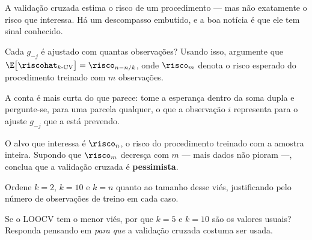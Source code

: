 A validação cruzada estima o risco de um procedimento --- mas não exatamente o
risco que interessa. Há um descompasso embutido, e a boa notícia é que ele tem
sinal conhecido.
\begin{itens}
  \item {} Cada $g_{-j}$ é ajustado com quantas observações? Usando isso,
        argumente que
        $\E\big[\riscohat_{k\text{-CV}}\big]=\risco_{n-n/k}$, onde $\risco_m$
        denota o risco esperado do procedimento treinado com $m$ observações.

        A conta é mais curta do que parece: tome a esperança dentro da soma dupla
        e pergunte-se, para uma parcela qualquer, o que a observação $i$ representa
        para o ajuste $g_{-j}$ que a está prevendo.
  \item {} O alvo que interessa é $\risco_n$, o risco do procedimento
        treinado com a amostra inteira. Supondo que $\risco_m$ decresça com $m$ ---
        mais dados não pioram ---, conclua que a validação cruzada é
        \textbf{pessimista}.
  \item {} Ordene $k=2$, $k=10$ e $k=n$ quanto ao tamanho desse viés,
        justificando pelo número de observações de treino em cada caso.
  \item {} Se o LOOCV tem o menor viés, por que $k=5$ e $k=10$ são os
        valores usuais? Responda pensando em \emph{para que} a validação cruzada
        costuma ser usada.
\end{itens}

